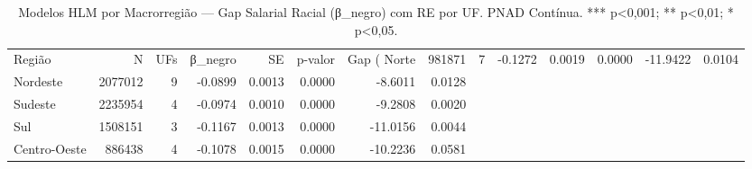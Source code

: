 \begin{table}
\caption{Modelos HLM por Macrorregião — Gap Salarial Racial (β_negro) com RE por UF. PNAD Contínua. *** p<0,001; ** p<0,01; * p<0,05.}
\label{tab:regional_hlm}
\begin{tabular}{lrrrrrrr}
\toprule
Região & N & UFs & β_negro & SE & p-valor & Gap (%
\midrule
Norte & 981871 & 7 & -0.1272 & 0.0019 & 0.0000 & -11.9422 & 0.0104 \\
Nordeste & 2077012 & 9 & -0.0899 & 0.0013 & 0.0000 & -8.6011 & 0.0128 \\
Sudeste & 2235954 & 4 & -0.0974 & 0.0010 & 0.0000 & -9.2808 & 0.0020 \\
Sul & 1508151 & 3 & -0.1167 & 0.0013 & 0.0000 & -11.0156 & 0.0044 \\
Centro-Oeste & 886438 & 4 & -0.1078 & 0.0015 & 0.0000 & -10.2236 & 0.0581 \\
\bottomrule
\end{tabular}
\end{table}
